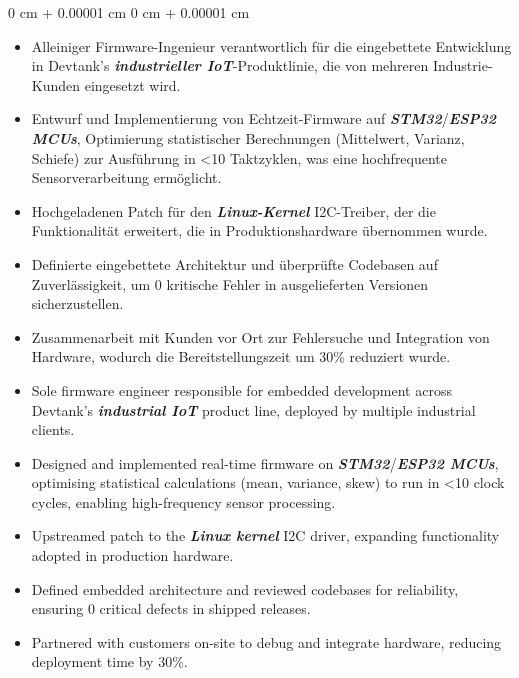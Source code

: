\documentclass[10pt, letterpaper]{article}
\newenvironment{highlights}{
    \begin{itemize}[
        topsep=0.2 cm,
        parsep=0.2 cm,
        partopsep=0pt,
        itemsep=0.025 cm,
        leftmargin=0 cm + 10pt
    ]
}{
    \end{itemize}
}
\newenvironment{onecolentry}{
    \begin{adjustwidth}{
        0 cm + 0.00001 cm
    }{
        0 cm + 0.00001 cm
    }
}{
    \end{adjustwidth}
}
\begin{document}
        \begin{onecolentry}
            \begin{highlights}
            \ifdefined\german
            \item Alleiniger Firmware-Ingenieur verantwortlich für die eingebettete Entwicklung in Devtank’s \textbf{\textit{industrieller IoT}}-Produktlinie, die von mehreren Industrie-Kunden eingesetzt wird.
            \item Entwurf und Implementierung von Echtzeit-Firmware auf \textbf{\textit{STM32}}/\textbf{\textit{ESP32 MCUs}}, Optimierung statistischer Berechnungen (Mittelwert, Varianz, Schiefe) zur Ausführung in <10 Taktzyklen, was eine hochfrequente Sensorverarbeitung ermöglicht.
            \item Hochgeladenen Patch für den \textbf{\textit{Linux-Kernel}} I2C-Treiber, der die Funktionalität erweitert, die in Produktionshardware übernommen wurde.
            \item Definierte eingebettete Architektur und überprüfte Codebasen auf Zuverlässigkeit, um 0 kritische Fehler in ausgelieferten Versionen sicherzustellen.
            \item Zusammenarbeit mit Kunden vor Ort zur Fehlersuche und Integration von Hardware, wodurch die Bereitstellungszeit um 30\% reduziert wurde.
            \else
            \item Sole firmware engineer responsible for embedded development across Devtank’s \textbf{\textit{industrial IoT}} product line, deployed by multiple industrial clients.
            \item Designed and implemented real-time firmware on \textbf{\textit{STM32}}/\textbf{\textit{ESP32 MCUs}}, optimising statistical calculations (mean, variance, skew) to run in <10 clock cycles, enabling high-frequency sensor processing.
            \item Upstreamed patch to the \textbf{\textit{Linux kernel}} I2C driver, expanding functionality adopted in production hardware.
                \item Defined embedded architecture and reviewed codebases for reliability, ensuring 0 critical defects in shipped releases.
                \item Partnered with customers on-site to debug and integrate hardware, reducing deployment time by 30\%.
            \fi
            \end{highlights}
        \end{onecolentry}
\end{document}
